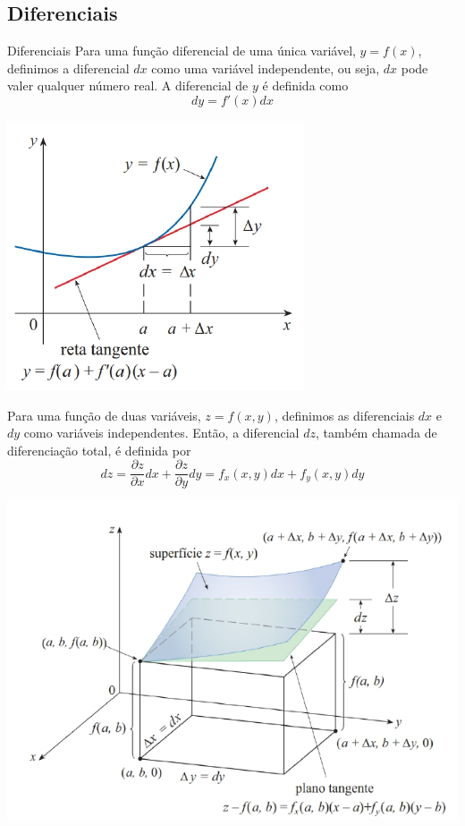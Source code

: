\subsection*{Diferenciais}
\begin{frame}[label=der-parciais]{Diferenciais}
Para uma função diferencial de uma única variável, $y = f(x)$, definimos a diferencial $dx$ como uma variável independente, ou seja, $dx$ pode valer qualquer número real. {\color{blue}A diferencial de $y$} é definida como
\[dy=f'(x) dx\]
\begin{center}
\includegraphics[scale=0.5]{figuras/diferenciais1.png}
\end{center}
\end{frame}

\begin{frame}[label=der-parciais]
Para uma função de duas variáveis, $z = f (x, y )$, definimos as diferenciais $dx$ e $dy$ como
variáveis independentes. Então, a {\color{blue}diferencial $dz$}, também chamada de {\color{blue} diferenciação total}, é definida por
\[dz
=\frac{\partial z}{\partial x}dx+\frac{\partial z}{\partial y}dy
=f_x(x,y)dx+f_y(x,y)dy\]
\begin{center}
\includegraphics[scale=0.4]{figuras/diferenciais2.png}
\end{center}

\end{frame}


